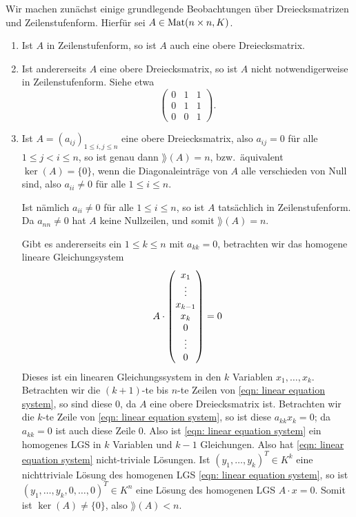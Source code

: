 \documentclass[a4paper,10pt]{scrartcl}
\begin{document}
Wir machen zunächst einige grundlegende Beobachtungen über Dreiecksmatrizen und Zeilenstufenform. Hierfür sei $A \in \mathrm{Mat}(n \times n, K)$.
\begin{enumerate}
 \item
  Ist $A$ in Zeilenstufenform, so ist $A$ auch eine obere Dreiecksmatrix.
 \item
  Ist andererseits $A$ eine obere Dreiecksmatrix, so ist $A$ nicht notwendigerweise in Zeilenstufenform. Siehe etwa
  \[
   \begin{pmatrix}
    0 & 1 & 1 \\
    0 & 1 & 1 \\
    0 & 0 & 1
   \end{pmatrix}.
  \]
 \item
  Ist $A = (a_{ij})_{1 \leq i,j \leq n}$ eine obere Dreiecksmatrix, also $a_{ij} = 0$ für alle $1 \leq j < i \leq n$, so ist genau dann $\rang(A) = n$, bzw.\ äquivalent $\ker(A) = \{0\}$, wenn die Diagonaleinträge von $A$ alle verschieden von Null sind, also $a_{ii} \neq 0$ für alle $1 \leq i \leq n$.
  
  Ist nämlich $a_{ii} \neq 0$ für alle $1 \leq i \leq n$, so ist $A$ tatsächlich in Zeilenstufenform. Da $a_{nn} \neq 0$ hat $A$ keine Nullzeilen, und somit $\rang(A) = n$.
  
  Gibt es andererseits ein $1 \leq k \leq n$ mit $a_{kk} = 0$, betrachten wir das homogene lineare Gleichungsystem
  \begin{equation}\label{eqn: linear equation system}
   A \cdot \begin{pmatrix} x_1 \\ \vdots \\ x_{k-1} \\ x_k \\ 0 \\ \vdots \\ 0 \end{pmatrix} = 0
  \end{equation}
  Dieses ist ein linearen Gleichungssystem in den $k$ Variablen $x_1, \dotsc, x_k$. Betrachten wir die $(k+1)$-te bis $n$-te Zeilen von \eqref{eqn: linear equation system}, so sind diese $0$, da $A$ eine obere Dreiecksmatrix ist. Betrachten wir die $k$-te Zeile von \eqref{eqn: linear equation system}, so ist diese $a_{kk} x_k = 0$; da $a_{kk} = 0$ ist auch diese Zeile $0$. Also ist \eqref{eqn: linear equation system} ein homogenes LGS in $k$ Variablen und $k-1$ Gleichungen. Also hat \eqref{eqn: linear equation system} nicht-triviale Lösungen. Ist $(y_1, \dotsc, y_k)^T \in K^k$ eine nichttriviale Lösung des homogenen LGS \eqref{eqn: linear equation system}, so ist $(y_1, \dotsc, y_k, 0, \dotsc, 0)^T \in K^n$ eine Lösung des homogenen LGS $A \cdot x = 0$. Somit ist $\ker(A) \neq \{0\}$, also $\rang(A) < n$.
\end{enumerate}
\end{document}
